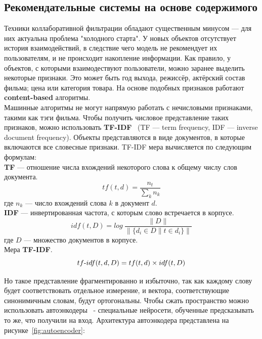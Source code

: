 \subsection{Рекомендательные системы на основе содержимого}\label{subsec:content_rec_systems}
Техники коллаборативной фильтрации обладают существенным минусом --- для них актуальна проблема "холодного старта".
У новых объектов отсутствует история взаимодействий, в следствие чего модель не рекомендует их пользователям, и не происходит накопление информации.
Как правило, у объектов, с которыми взаимодествуют пользователи, можно заранее выделить некоторые признаки.
Это может быть год выхода, режиссёр, актёрский состав фильма; цена или категория товара.
На основе подобных признаков работают \textbf{content-based} алгоритмы.
\\Машинные алгоритмы не могут напрямую работать с нечисловыми признаками, такими как тэги фильма.
Чтобы получить числовое представление таких признаков, можно использовать \textbf{TF-IDF}~\cite{tfidf} (TF — term frequency, IDF — inverse document frequency).
Объекты представляются в виде документов, в которые включаются все словесные признаки.
TF-IDF мера вычисляется по следующим формулам:
\\\textbf{TF} --- отношение числа вхождений некоторого слова к общему числу слов документа.
\begin{equation}\label{eq:tf}
        tf(t, d) = \frac{n_{t}}{\sum_{k}{n_{k}}}
\end{equation}
где $n_{k}$ --- число вхождений слова $k$ в документ $d$.
\\\textbf{IDF} --- инвертированная частота, с которым слово встречается в корпусе.
\begin{equation}\label{eq:idf}
        idf(t, D) = log~\frac{\|D\|}{\|\{d_{i} \in D \| t \in d_{i}\}\|}
\end{equation}
где $D$ --- множество документов в корпусе.
\\Мера \textbf{TF-IDF}.
\begin{equation}\label{eq:tf-idf}
        tf\textnormal{-}idf(t, d, D) = tf(t, d) \times idf(t, D)
\end{equation}

Но такое представление фрагментированно и избыточно, так как каждому слову будет соответствовать отдельное измерение, и вектора, соответствующие синонимичным словам, будут ортогональны.
Чтобы сжать пространство можно использовать автоэнкодеры~\cite{autoencoders} - специальные нейросети, обученные предсказывать то же, что получили на вход.
Архитектура автоэнкодера представлена на рисунке~\ref{fig:autoencoder}:

